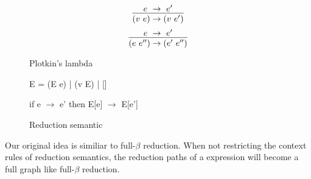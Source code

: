 \begin{figure}[ht]
	\centering
	\[\infer {(v~e) \rightarrow (v~e')}{e~\rightarrow~e'}  \]
	\[\infer {(e~e'') \rightarrow (e'~e'')} {e~\rightarrow~e'}  \]
	\caption{Plotkin's lambda}
	\label{fig:plotkin}
\end{figure} 

\begin{figure}[ht]
	\centering 
	E = (E e) | (v E) | []
	
	if e $\rightarrow$ e' then E[e] $\rightarrow$ E[e']
	\caption{Reduction semantic}
	\label{fig:felleisen}
\end{figure} 

Our original idea is similiar to full-$\beta$ reduction. When not restricting the context rules of reduction semantics, the reduction paths of a expression will become a full graph like full-$\beta$ reduction.